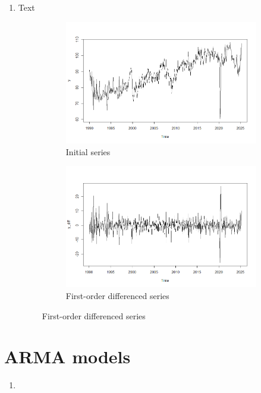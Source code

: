 \documentclass[12pt]{article}
\begin{document}
\begin{enumerate}
        \item Text
        \begin{figure}[h]
            \centering
            \begin{subfigure}[b]{0.49\linewidth}
                \centering
                \includegraphics[width=\linewidth]{plot series.png}
                \caption{Initial series}
                \label{fig:plot_series}
            \end{subfigure}
            \hfill
            \begin{subfigure}[b]{0.49\linewidth}
                \centering
                \includegraphics[width=\linewidth]{plot y_diff.png}
                \caption{First-order differenced series}
                \label{fig:plot_series_diff}
            \end{subfigure}
        \end{figure}
    \end{enumerate}

    \section{ARMA models}

    \begin{enumerate}
        \item 
    \end{enumerate}

\end{document}
